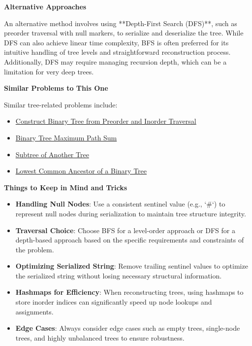 \textbf{Alternative Approaches}

An alternative method involves using **Depth-First Search (DFS)**, such as preorder traversal with null markers, to serialize and deserialize the tree. While DFS can also achieve linear time complexity, BFS is often preferred for its intuitive handling of tree levels and straightforward reconstruction process. Additionally, DFS may require managing recursion depth, which can be a limitation for very deep trees.

\textbf{Similar Problems to This One}

Similar tree-related problems include:
\begin{itemize}
    \item \hyperref[problem:construct_binary_tree_from_preorder_and_inorder_traversal]{Construct Binary Tree from Preorder and Inorder Traversal}
    \item \hyperref[problem:binary_tree_maximum_path_sum]{Binary Tree Maximum Path Sum}
    \item \hyperref[problem:subtree_of_another_tree]{Subtree of Another Tree}
    \item \hyperref[problem:lowest_common_ancestor_of_a_binary_tree]{Lowest Common Ancestor of a Binary Tree}
\end{itemize}

\textbf{Things to Keep in Mind and Tricks}

\begin{itemize}
    \item \textbf{Handling Null Nodes}: Use a consistent sentinel value (e.g., `\#`) to represent null nodes during serialization to maintain tree structure integrity.
    \item \textbf{Traversal Choice}: Choose BFS for a level-order approach or DFS for a depth-based approach based on the specific requirements and constraints of the problem.
    \item \textbf{Optimizing Serialized String}: Remove trailing sentinel values to optimize the serialized string without losing necessary structural information.
    \item \textbf{Hashmaps for Efficiency}: When reconstructing trees, using hashmaps to store inorder indices can significantly speed up node lookups and assignments.
    \item \textbf{Edge Cases}: Always consider edge cases such as empty trees, single-node trees, and highly unbalanced trees to ensure robustness.
\end{itemize}


